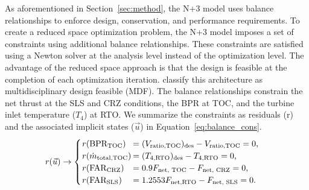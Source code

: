 \documentclass[conf]{new-aiaa}
\begin{document}
As aforementioned in Section~\ref{sec:method}, the N+3 model uses balance relationships to enforce design, conservation, and performance requirements.
To create a reduced space optimization problem, the N+3 model imposes a set of constraints using additional balance relationships.
These constraints are satisfied using a Newton solver at the analysis level instead of the optimization level.
The advantage of the reduced space approach is that the design is feasible at the completion of each optimization iteration.
\citet{Martins2013} classify this architecture as multidisciplinary design feasible (MDF).
The balance relationships constrain the net thrust at the SLS and CRZ conditions, the BPR at TOC, and the turbine inlet temperature ($T_4$) at RTO.
We summarize the constraints as residuals (r) and the associated implicit states ($\vec{u}$) in Equation~\eqref{eq:balance_cons}.
\begin{equation}
    \label{eq:balance_cons}
    r(\vec{u}) \rightarrow
    \begin{cases}
        \setlength{\tabcolsep}{1pt}
        \begin{tabular}{l l}
            $r(\text{BPR}_\text{TOC})$    & $= (V_\text{ratio,TOC})_\text{des} - V_\text{ratio,TOC} = 0$, \\
            $r(\dot{m}_\text{total,TOC})$ & $= (T_{4,\text{RTO}})_\text{des} - T_{4,\text{RTO}} = 0$,     \\
            $r(\text{FAR}_\text{CRZ})$    & $= 0.9 F_\text{net, TOC} - F_\text{net, CRZ} = 0$,            \\
            $r(\text{FAR}_\text{SLS})$    & $= 1.2553 F_\text{net,RTO} - F_\text{net, SLS} = 0$.          \\
        \end{tabular}
    \end{cases}
\end{equation}
\end{document}
